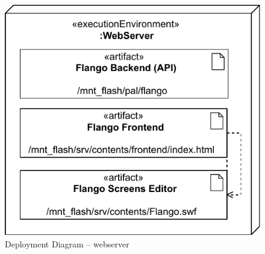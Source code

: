 \begin{figure}[htb]
    \centering
    \includegraphics{figures/design-deployment-webserver.pdf}
    \caption{Deployment Diagram -- webserver}
    \label{fig:deploy-webserver}
\end{figure}

\FloatBarrier
